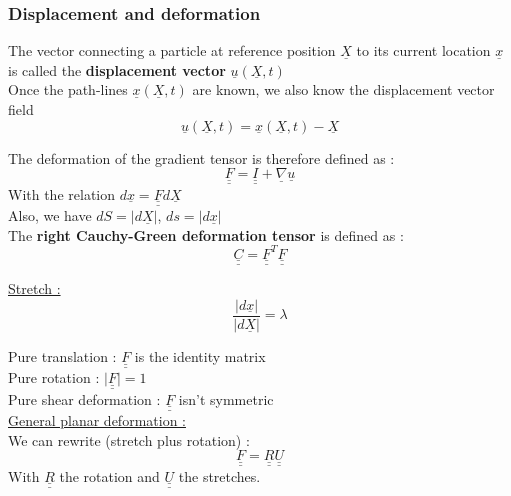 \documentclass[../main.tex]{subfiles}
\begin{document}
\subsubsection{Displacement and deformation}
The vector connecting a particle at reference position $\underline{X}$ to its current location $\underline{x}$ is called the \textbf{displacement vector} $\underline{u}(\underline{X},t)$\\

Once the path-lines $\underline{x}(\underline{X},t)$ are known, we also know the displacement vector field \begin{equation}
    \underline{u} (\underline{X},t) = \underline{x}(\underline{X},t)-\underline{X}
\end{equation}

The deformation of the gradient tensor is therefore defined as :\\
\begin{equation}
    \underline{\underline{F}} = \underline{\underline{I}} + \underline{\nabla} \underline{u}
\end{equation}
With the relation $d\underline{x} = \underline{\underline{F}} d\underline{X}$\\

Also, we have $dS = \lvert d\underline{X}\rvert $, $ds = \lvert d\underline{x}\rvert$\\
The \textbf{right Cauchy-Green deformation tensor} is defined as :\begin{equation}
    \underline{\underline{C}} = \underline{\underline{F}}^T\underline{\underline{F}}
\end{equation}

\quad \underline{Stretch :} \begin{equation}
    \frac{\lvert d\underline{x}\rvert}{\lvert d\underline{X}\rvert} = \lambda
\end{equation}

Pure translation : $\underline{\underline{F}}$ is the identity matrix\\
Pure rotation : $\lvert \underline{\underline{F}} \rvert = 1$\\
Pure shear deformation : $\underline{\underline{F}}$ isn't symmetric\\

\quad \underline{General planar deformation :}\\
We can rewrite (stretch plus rotation) :
\begin{equation}
\underline{\underline{F}} = \underline{\underline{R}} \underline{\underline{U}}
\end{equation}
With $\underline{\underline{R}}$ the rotation and $\underline{\underline{U}}$ the stretches.\\
\end{document}
